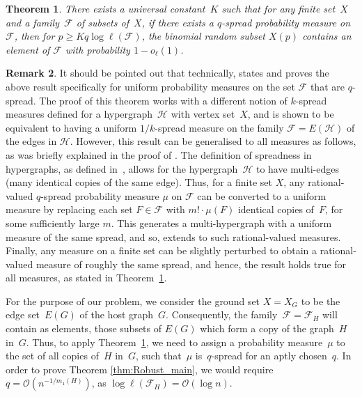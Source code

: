 \documentclass[final]{article}
\def\mcite[#1]#2{\mbox{\cite[#1]{#2}}}
\newtheorem{theorem}{Theorem}[section]
\theoremstyle{definition}
\newtheorem{remark}[theorem]{Remark}
\begin{document}
\begin{theorem}
    \label{thm:FKNP_spread_measure}
    There exists a universal constant~$K$ such that for any finite set~$X$ and a family~$\mathcal{F}$ of subsets of~$X$, if there exists a \/$q$-spread probability measure on~$\mathcal{F}$, then for\/ $p \geq K q \log{\ell(\mathcal{F})}$, the binomial random subset\/ $X(p)$ contains an element of\/ $\mathcal{F}$ with probability $1 - o_{\ell}(1)$.
\end{theorem} 

\begin{remark}
    It should be pointed out that technically, \mcite[Theorem 1.6]{FKNP_Fractional_Thresholds} states and proves the above result specifically for uniform probability measures on the set ${\mathcal{F}}$ that are $q$-spread. The proof of this theorem works with a different notion of $k$-spread measures defined for a hypergraph~$\mathcal{H}$ with vertex set~$X$, and is shown to be equivalent to having a uniform $1/k$-spread measure on the family $\mathcal{F} = E(\mathcal{H})$ of the edges in $\mathcal{H}$. However, this result can be generalised to all measures as follows, as was briefly explained in the proof of \mcite[Theorem 1.1]{FKNP_Fractional_Thresholds}. 
    \newline \indent The definition of spreadness in hypergraphs, as defined in~\cite{FKNP_Fractional_Thresholds}, allows for the hypergraph~$\mathcal{H}$ to have multi-edges (many identical copies of the same edge). Thus, for a finite set $X$, any rational-valued $q$-spread probability measure $\mu$ on $\mathcal{F}$ can be converted to a uniform measure by replacing each set $F \in \mathcal{F}$ with $m!\cdot \mu(F)$ identical copies of~$F$, for some sufficiently large $m$. This generates a multi-hypergraph with a uniform measure of the same spread, and so, \mcite[Theorem 1.6]{FKNP_Fractional_Thresholds} extends to such rational-valued measures. Finally, any measure on a finite set can be slightly perturbed to obtain a rational-valued measure of roughly the same spread, and hence, the result holds true for all measures, as stated in Theorem~\ref{thm:FKNP_spread_measure}.
\end{remark}

For the purpose of our problem, we consider the ground set $X = X_G$ to be the edge set~$E(G)$ of the host graph~$G$. Consequently, the family~$\mathcal{F} = \mathcal{F}_H$ will contain as elements, those subsets of $E(G)$ which form a copy of the graph~$H$ in~$G$. Thus, to apply Theorem~\ref{thm:FKNP_spread_measure}, we need to assign a probability measure~$\mu$ to the set of all copies of~$H$ in~$G$, such that~$\mu$ is~$q$-spread for an aptly chosen~$q$. In order to prove Theorem \ref{thm:Robust_main}, we would require $q = \mathcal{O}(n^{-1/m_1(H)})$, as $\log{\ell(\mathcal{F}_H)} = \mathcal{O}(\log n)$. 
\end{document}
